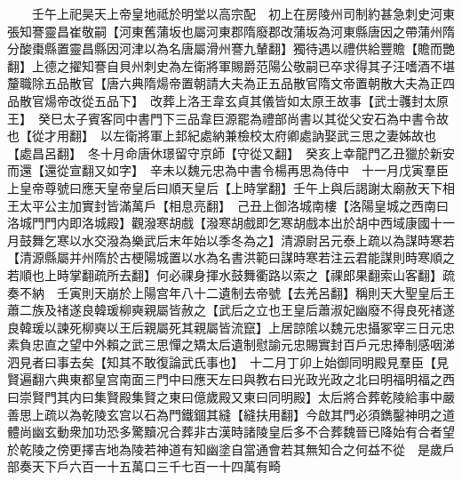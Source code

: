 　　壬午上祀昊天上帝皇地祗於明堂以高宗配　初上在房陵州司制約甚急刺史河東張知謇靈昌崔敬嗣【河東舊蒲坂也屬河東郡隋廢郡改蒲坂為河東縣唐因之帶蒲州隋分酸棗縣置靈昌縣因河津以為名唐屬滑州謇九輦翻】獨待遇以禮供給豐贍【贍而艷翻】上德之擢知謇自貝州刺史為左衛將軍賜爵范陽公敬嗣已卒求得其子汪嗜酒不堪釐職除五品散官【唐六典隋煬帝置朝請大夫為正五品散官隋文帝置朝散大夫為正四品散官煬帝改從五品下】　改葬上洛王韋玄貞其儀皆如太原王故事【武士彠封太原王】　癸巳太子賓客同中書門下三品韋巨源罷為禮部尚書以其從父安石為中書令故也【從才用翻】　以左衛將軍上邽紀處納兼檢校太府卿處訥娶武三思之妻姊故也【處昌呂翻】　冬十月命唐休璟留守京師【守從又翻】　癸亥上幸龍門乙丑獵於新安而還【還從宣翻又如字】　辛未以魏元忠為中書令楊再思為侍中　十一月戊寅羣臣上皇帝尊號曰應天皇帝皇后曰順天皇后【上時掌翻】壬午上與后謁謝太廟赦天下相王太平公主加實封皆滿萬戶【相息亮翻】　己丑上御洛城南樓【洛陽皇城之西南曰洛城門門内即洛城殿】觀潑寒胡戲【潑寒胡戲即乞寒胡戲本出於胡中西域康國十一月鼓舞乞寒以水交潑為樂武后末年始以季冬為之】清源尉呂元泰上疏以為謀時寒若【清源縣屬并州隋於古梗陽城置以水為名書洪範曰謀時寒若注云君能謀則時寒順之若順也上時掌翻疏所去翻】何必祼身揮水鼓舞衢路以索之【祼郎果翻索山客翻】疏奏不納　壬寅則天崩於上陽宫年八十二遺制去帝號【去羌呂翻】稱則天大聖皇后王蕭二族及禇遂良韓瑗柳奭親屬皆赦之【武后之立也王皇后蕭淑妃幽廢不得良死禇遂良韓瑗以諫死柳奭以王后親屬死其親屬皆流竄】上居諒隂以魏元忠攝冢宰三日元忠素負忠直之望中外賴之武三思憚之矯太后遺制慰諭元忠賜實封百戶元忠捧制感咽涕泗見者曰事去矣【知其不敢復論武氏事也】　十二月丁卯上始御同明殿見羣臣【見賢遍翻六典東都皇宫南面三門中曰應天左曰與教右曰光政光政之北曰明福明福之西曰崇賢門其内曰集賢殿集賢之東曰億歲殿又東曰同明殿】太后將合葬乾陵給事中嚴善思上疏以為乾陵玄宫以石為門鐵錮其縫【縫扶用翻】今啟其門必須鐫鑿神明之道體尚幽玄動衆加功恐多驚黷况合葬非古漢時諸陵皇后多不合葬魏晉已降始有合者望於乾陵之傍更擇吉地為陵若神道有知幽塗自當通會若其無知合之何益不從　是歲戶部奏天下戶六百一十五萬口三千七百一十四萬有畸

